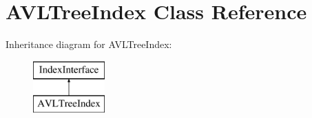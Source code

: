 \section{A\+V\+L\+Tree\+Index Class Reference}
\label{class_a_v_l_tree_index}
Inheritance diagram for A\+V\+L\+Tree\+Index\+:\begin{figure}[H]
\begin{center}
\leavevmode
\includegraphics[height=2.000000cm]{class_a_v_l_tree_index}
\end{center}
\end{figure}
